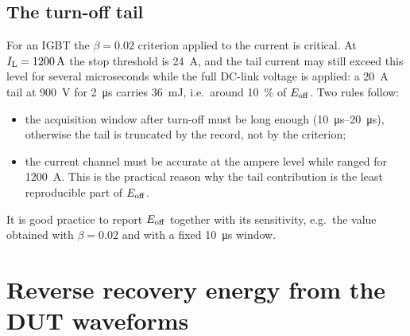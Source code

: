 \subsection{The turn-off tail}

For an IGBT the $\beta=0.02$ criterion applied to the current is critical. At
$I_{\mathrm{L}}=\SI{1200}{\ampere}$ the stop threshold is \SI{24}{\ampere}, and the tail current may
still exceed this level for several microseconds while the full DC-link voltage is
applied: a \SI{20}{\ampere} tail at \SI{900}{\volt} for \SI{2}{\micro\second} carries
\SI{36}{\milli\joule}, i.e.\ around \SI{10}{\percent} of $E_{\mathrm{off}}$. Two rules follow:
\begin{itemize}
\item the acquisition window after turn-off must be long enough
(\SIrange{10}{20}{\micro\second}), otherwise the tail is truncated by the record, not by
the criterion;
\item the current channel must be accurate at the ampere level while ranged for
\SI{1200}{\ampere}. This is the practical reason why the tail contribution is the least
reproducible part of $E_{\mathrm{off}}$.
\end{itemize}
It is good practice to report $E_{\mathrm{off}}$ together with its sensitivity, e.g.\ the value
obtained with $\beta=0.02$ and with a fixed \SI{10}{\micro\second} window.

\section{Reverse recovery energy from the DUT waveforms}

